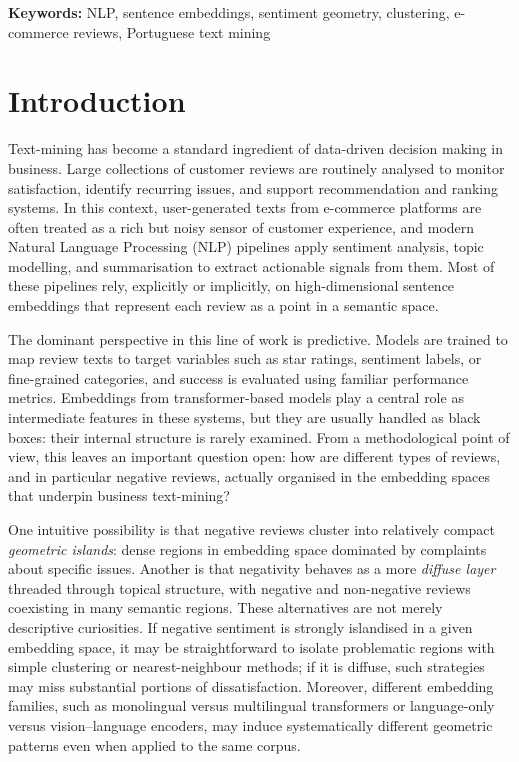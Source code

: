 \documentclass[a4paper,11pt]{article}
\begin{document}
\vspace{0.3cm}
\noindent\textbf{Keywords:} NLP, sentence embeddings, sentiment geometry, clustering, e-commerce reviews, Portuguese text mining

\clearpage
\clearpage

\twocolumn
{}
\setlength{\parskip}{0.2cm}
\setlength{\parindent}{1em}
\pagestyle{fancy}
\section{Introduction}
Text-mining has become a standard ingredient of data-driven decision making in business. 
Large collections of customer reviews are routinely analysed to monitor satisfaction, identify recurring issues, and support recommendation and ranking systems. 
In this context, user-generated texts from e-commerce platforms are often treated as a rich but noisy sensor of customer experience, and modern Natural Language Processing (NLP) pipelines apply sentiment analysis, topic modelling, and summarisation to extract actionable signals from them. 
Most of these pipelines rely, explicitly or implicitly, on high-dimensional sentence embeddings that represent each review as a point in a semantic space.

The dominant perspective in this line of work is predictive. 
Models are trained to map review texts to target variables such as star ratings, sentiment labels, or fine-grained categories, and success is evaluated using familiar performance metrics. 
Embeddings from transformer-based models play a central role as intermediate features in these systems, but they are usually handled as black boxes: their internal structure is rarely examined. 
From a methodological point of view, this leaves an important question open: how are different types of reviews, and in particular negative reviews, actually organised in the embedding spaces that underpin business text-mining?

One intuitive possibility is that negative reviews cluster into relatively compact \emph{geometric islands}: dense regions in embedding space dominated by complaints about specific issues. 
Another is that negativity behaves as a more \emph{diffuse layer} threaded through topical structure, with negative and non-negative reviews coexisting in many semantic regions. 
These alternatives are not merely descriptive curiosities. 
If negative sentiment is strongly islandised in a given embedding space, it may be straightforward to isolate problematic regions with simple clustering or nearest-neighbour methods; if it is diffuse, such strategies may miss substantial portions of dissatisfaction. 
Moreover, different embedding families, such as monolingual versus multilingual transformers or language-only versus vision--language encoders, may induce systematically different geometric patterns even when applied to the same corpus.
\end{document}
